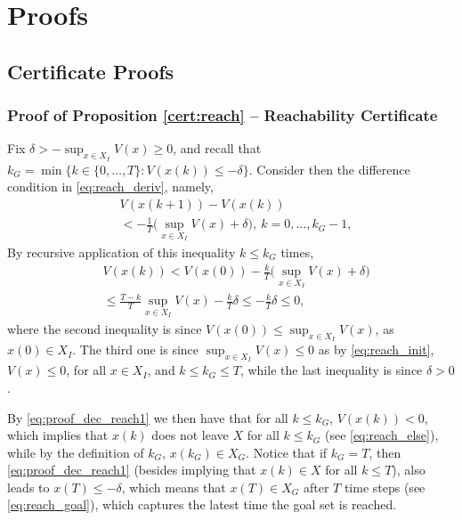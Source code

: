 \section{Proofs}
\label{app:proofs}

\subsection{Certificate Proofs}

\subsubsection{Proof of Proposition \ref{cert:reach} -- Reachability Certificate}
Fix $\delta > -\sup_{x \in X_I} V(x) \geq 0$, and recall that $k_G = \min \{k \in \{0,\dots,T\} \colon V(x(k)) \leq -\delta\}$. Consider then the difference condition in \eqref{eq:reach_deriv}, namely,
    \begin{equation} \label{eq:proof_dec_reach}
        \begin{aligned}
		&V(x(k+1)) - V(x(k)) \\ 
        & < - \frac{1}{T}\Big (\sup_{x \in X_I} V(x)+\delta \Big),~ k=0,\dots,k_G-1,
        \end{aligned}
    \end{equation}
By recursive application of this inequality $k \leq k_G$ times, 
\begin{align}
&V(x(k)) < V(x(0)) -\frac{k}{T} \Big ( \sup_{x \in X_I} V(x) +\delta\Big ) \nonumber \\
&\leq \frac{T-k}{T} \sup_{x \in X_I} V(x) -\frac{k}{T} \delta  \leq -\frac{k}{T} \delta \leq 0, \label{eq:proof_dec_reach1}
\end{align}
where the second inequality is since $V(x(0)) \leq \sup_{x \in X_I} V(x)$, as $x(0) \in X_I$. The third
one is since $\sup_{x \in X_I} V(x) \leq 0$ as by \eqref{eq:reach_init}, $V(x) \leq 0$, for all $x \in X_I$, and  $k \leq k_G \leq T$, while the last inequality is since $\delta>0$.


By \eqref{eq:proof_dec_reach1} we then have that for all $k\leq k_G$, $V(x(k)) <0$, which implies that $x(k)$ does not leave $X$ for all $k\leq k_G$ (see \eqref{eq:reach_else}), while by the definition of $k_G$, $x(k_G) \in X_G$. Notice that if $k_G = T$, then \eqref{eq:proof_dec_reach1} (besides implying that $x(k) \in X$ for all $k\leq T$), also leads to $x(T) \leq -\delta$, which means that $x(T) \in X_G$ after $T$ time steps (see \eqref{eq:reach_goal}), which captures the latest time the goal set is reached.

